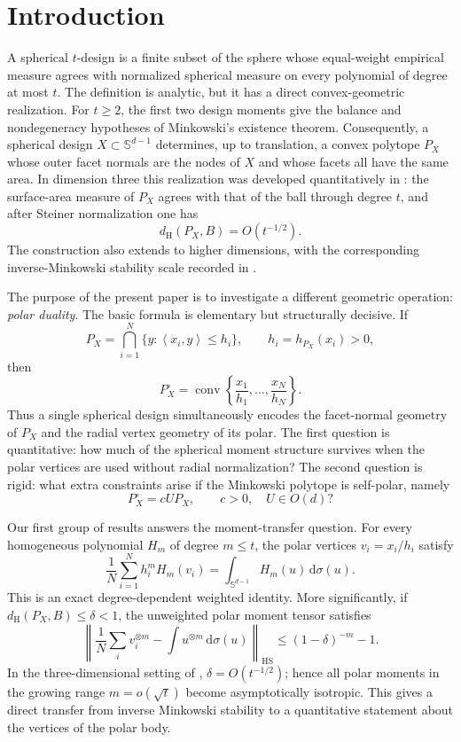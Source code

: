 \documentclass[11pt]{amsart}
\theoremstyle{definition}
\theoremstyle{remark}
\newcommand{\Sph}{\mathbb S}
\newcommand{\conv}{\operatorname{conv}}
\newcommand{\dd}{\,\mathrm d}
\newcommand{\ip}[2]{\left\langle #1,#2\right\rangle}
\newcommand{\dH}{d_{\mathrm H}}
\newcommand{\HS}{\mathrm{HS}}
\begin{document}
\maketitle

\section{Introduction}

A spherical $t$-design is a finite subset of the sphere whose equal-weight empirical measure agrees with normalized spherical measure on every polynomial of degree at most $t$.  The definition is analytic, but it has a direct convex-geometric realization.  For $t\ge2$, the first two design moments give the balance and nondegeneracy hypotheses of Minkowski's existence theorem.  Consequently, a spherical design $X\subset\Sph^{d-1}$ determines, up to translation, a convex polytope $P_X$ whose outer facet normals are the nodes of $X$ and whose facets all have the same area.  In dimension three this realization was developed quantitatively in \cite{An2026}: the surface-area measure of $P_X$ agrees with that of the ball through degree $t$, and after Steiner normalization one has
\[
 \dH(P_X,B)=O(t^{-1/2}).
\]
The construction also extends to higher dimensions, with the corresponding inverse-Minkowski stability scale recorded in \cite{An2026}.

The purpose of the present paper is to investigate a different geometric operation: \emph{polar duality}.  The basic formula is elementary but structurally decisive.  If
\[
 P_X=\bigcap_{i=1}^N\{y:\ip{x_i}{y}\le h_i\},
 \qquad h_i=h_{P_X}(x_i)>0,
\]
then
\[
 P_X^\circ=\conv\left\{\frac{x_1}{h_1},\ldots,\frac{x_N}{h_N}\right\}.
\]
Thus a single spherical design simultaneously encodes the facet-normal geometry of $P_X$ and the radial vertex geometry of its polar.  The first question is quantitative: how much of the spherical moment structure survives when the polar vertices are used without radial normalization?  The second question is rigid: what extra constraints arise if the Minkowski polytope is self-polar, namely
\[
 P_X^\circ=cUP_X,
 \qquad c>0,\quad U\in O(d)?
\]

Our first group of results answers the moment-transfer question.  For every homogeneous polynomial $H_m$ of degree $m\le t$, the polar vertices $v_i=x_i/h_i$ satisfy
\[
 \frac1N\sum_{i=1}^Nh_i^mH_m(v_i)
 =\int_{\Sph^{d-1}}H_m(u)\dd\sigma(u).
\]
This is an exact degree-dependent weighted identity.  More significantly, if $\dH(P_X,B)\le\delta<1$, the unweighted polar moment tensor satisfies
\[
 \left\|\frac1N\sum_i v_i^{\otimes m}
      -\int u^{\otimes m}\dd\sigma(u)\right\|_{\HS}
 \le (1-\delta)^{-m}-1.
\]
In the three-dimensional setting of \cite{An2026}, $\delta=O(t^{-1/2})$; hence all polar moments in the growing range $m=o(\sqrt t)$ become asymptotically isotropic.  This gives a direct transfer from inverse Minkowski stability to a quantitative statement about the vertices of the polar body.
\end{document}
